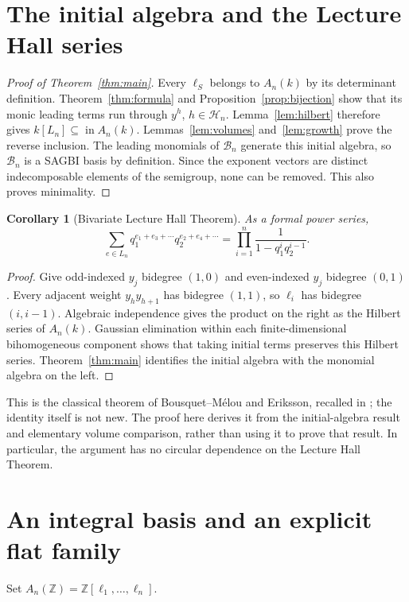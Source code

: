 \documentclass[11pt]{article}
\newtheorem{corollary}[theorem]{Corollary}
\theoremstyle{definition}
\theoremstyle{remark}
\newcommand{\Z}{\mathbb Z}
\newcommand{\inA}{\operatorname{in}}
\begin{document}
\section{The initial algebra and the Lecture Hall series}
\begin{proof}[Proof of Theorem~\ref{thm:main}]
Every $\ell_S$ belongs to $A_n(k)$ by its determinant definition.
Theorem~\ref{thm:formula} and Proposition~\ref{prop:bijection} show that
its monic leading terms run through $y^h$, $h\in\mathcal H_n$.
Lemma~\ref{lem:hilbert} therefore gives
$k[L_n]\subseteq\inA A_n(k)$.
Lemmas~\ref{lem:volumes} and~\ref{lem:growth} prove the reverse inclusion.
The leading monomials of $\mathcal B_n$ generate this initial algebra, so
$\mathcal B_n$ is a SAGBI basis by definition. Since the exponent vectors
are distinct indecomposable elements of the semigroup, none can be
removed. This also proves minimality.
\end{proof}

\begin{corollary}[Bivariate Lecture Hall Theorem]\label{cor:series}
As a formal power series,
\[
 \sum_{e\in L_n}q_1^{e_1+e_3+\cdots}q_2^{e_2+e_4+\cdots}
 =\prod_{i=1}^n\frac{1}{1-q_1^i q_2^{i-1}}.
\]
\end{corollary}
\begin{proof}
Give odd-indexed $y_j$ bidegree $(1,0)$ and even-indexed $y_j$ bidegree
$(0,1)$. Every adjacent weight $y_hy_{h+1}$ has bidegree $(1,1)$, so
$\ell_i$ has bidegree $(i,i-1)$. Algebraic independence gives the product
on the right as the Hilbert series of $A_n(k)$. Gaussian elimination
within each finite-dimensional bihomogeneous component shows that taking
initial terms preserves this Hilbert series. Theorem~\ref{thm:main}
identifies the initial algebra with the monomial algebra on the left.
\end{proof}

This is the classical theorem of Bousquet--M\'elou and Eriksson, recalled
in \cite[Theorem 1.2]{Katthan}; the identity itself is not new. The proof
here derives it from the initial-algebra result and elementary volume
comparison, rather than using it to prove that result. In particular,
the argument has no circular dependence on the Lecture Hall Theorem.

\section{An integral basis and an explicit flat family}
Set $A_n(\Z)=\Z[\ell_1,\ldots,\ell_n]$.
\end{document}
